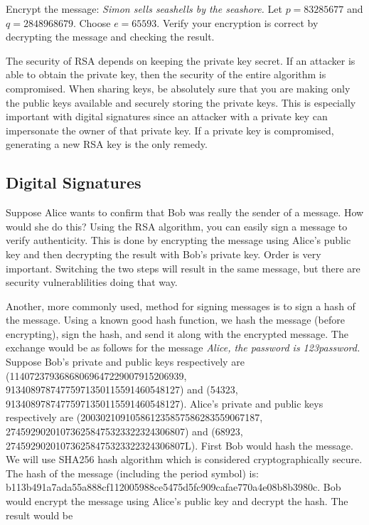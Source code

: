 \begin{problem}
Encrypt the message: \emph{Simon sells seashells by the seashore.}
Let $p=83285677$ and $q=2848968679$.
Choose $e=65593$.
Verify your encryption is correct by decrypting the message and checking the result.
\end{problem}

\begin{warn}
The security of RSA depends on keeping the private key secret.  
If an attacker is able to obtain the private key, then the security of the entire algorithm is compromised.
When sharing keys, be absolutely sure that you are making only the public keys available and securely storing the private keys.
This is especially important with digital signatures since an attacker with a private key can impersonate the owner of that private key.
If a private key is compromised, generating a new RSA key is the only remedy.
\end{warn}


\subsection*{Digital Signatures}
Suppose Alice wants to confirm that Bob was really the sender of a message.
How would she do this?
Using the RSA algorithm, you can easily sign a message to verify authenticity.
This is done by encrypting the message using Alice's public key and then decrypting the result with Bob's private key.
Order is very important.  
Switching the two steps will result in the same message, but there are security vulnerablilities doing that way.

Another, more commonly used, method for signing messages is to sign a hash of the message.
Using a known good hash function, we hash the message (before encrypting), sign the hash, and send it along with the encrypted message.
The exchange would be as follows for the message \emph{Alice, the password is 123password.}
Suppose Bob's private and public keys respectively are (11407237936868069647229007915206939, 91340897874775971350115591460548127) and (54323, 91340897874775971350115591460548127).
Alice's private and public keys respectively are (200302109105861235857586283559067187, 274592902010736258475323322324306807) and (68923, 274592902010736258475323322324306807L).
First Bob would hash the message.  We will use SHA256 hash algorithm which is considered cryptographically secure.
The hash of the message (including the period symbol) is: b113b491a7ada55a888cf112005988ce5475d5fc909cafae770a4e08b8b3980c.
Bob would encrypt the message using Alice's public key and decrypt the hash.
The result would be 


